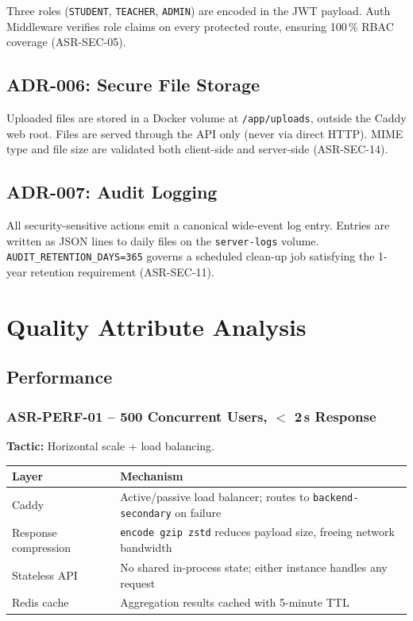 \documentclass[12pt,a4paper]{article}
\begin{document}
Three roles (\texttt{STUDENT}, \texttt{TEACHER}, \texttt{ADMIN}) are encoded in the JWT payload. Auth Middleware verifies role claims on every protected route, ensuring 100\,\% RBAC coverage (ASR-SEC-05).

\subsection{ADR-006: Secure File Storage}

Uploaded files are stored in a Docker volume at \texttt{/app/uploads}, outside the Caddy web root. Files are served through the API only (never via direct HTTP). MIME type and file size are validated both client-side and server-side (ASR-SEC-14).

\subsection{ADR-007: Audit Logging}

All security-sensitive actions emit a canonical wide-event log entry. Entries are written as JSON lines to daily files on the \texttt{server-logs} volume. \texttt{AUDIT\_RETENTION\_DAYS=365} governs a scheduled clean-up job satisfying the 1-year retention requirement (ASR-SEC-11).

\section{Quality Attribute Analysis}

\subsection{Performance}

\subsubsection{ASR-PERF-01 -- 500 Concurrent Users, $<$ 2\,s Response}

\textbf{Tactic:} Horizontal scale + load balancing.

\begin{tabularx}{\textwidth}{L{4cm} L{9.5cm}}
  \toprule
  \textbf{Layer} & \textbf{Mechanism} \\
  \midrule
  Caddy & Active/passive load balancer; routes to \texttt{backend-secondary} on failure \\
  Response compression & \texttt{encode gzip zstd} reduces payload size, freeing network bandwidth \\
  Stateless API & No shared in-process state; either instance handles any request \\
  Redis cache & Aggregation results cached with 5-minute TTL \\
  \bottomrule
\end{tabularx}
\end{document}
